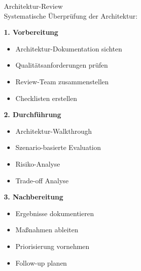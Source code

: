 \begin{KR}{Architektur-Review}\\
Systematische Überprüfung der Architektur:

\textbf{1. Vorbereitung}
\begin{itemize}
    \item Architektur-Dokumentation sichten
    \item Qualitätsanforderungen prüfen
    \item Review-Team zusammenstellen
    \item Checklisten erstellen
\end{itemize}

\textbf{2. Durchführung}
\begin{itemize}
    \item Architektur-Walkthrough
    \item Szenario-basierte Evaluation
    \item Risiko-Analyse
    \item Trade-off Analyse
\end{itemize}

\textbf{3. Nachbereitung}
\begin{itemize}
    \item Ergebnisse dokumentieren
    \item Maßnahmen ableiten
    \item Priorisierung vornehmen
    \item Follow-up planen
\end{itemize}
\end{KR}

